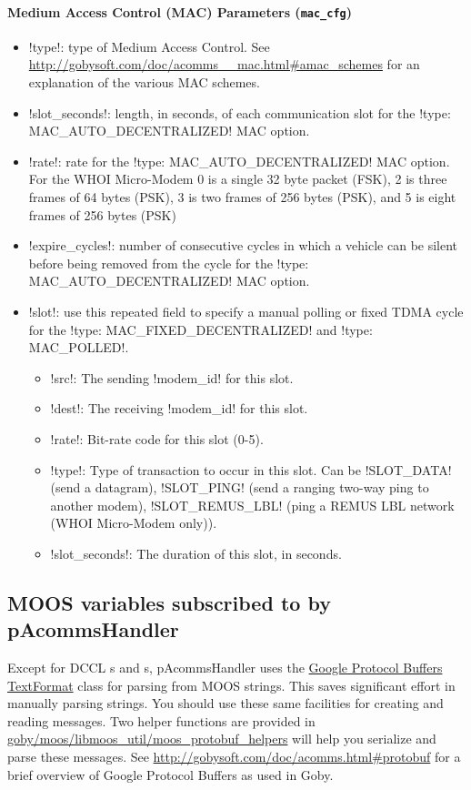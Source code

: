 \paragraph{Medium Access Control (MAC) Parameters (\texttt{mac\_cfg})}
\begin{itemize}
\item !type!: type of Medium Access Control. See \url{http://gobysoft.com/doc/acomms__mac.html#amac_schemes} for an explanation of the various MAC schemes.
\item !slot_seconds!: length, in seconds, of each communication slot for the !type: MAC_AUTO_DECENTRALIZED! MAC option.
\item !rate!: rate for the !type: MAC_AUTO_DECENTRALIZED! MAC option. For the WHOI Micro-Modem 0 is a single 32 byte packet (FSK), 2 is three frames of 64 bytes (PSK), 3 is two frames of 256 bytes (PSK), and 5 is eight frames of 256 bytes (PSK)
\item !expire_cycles!: number of consecutive cycles in which a vehicle can be silent before being removed from the cycle for the !type: MAC_AUTO_DECENTRALIZED! MAC option.
\item !slot!: use this repeated field to specify a manual polling or fixed TDMA cycle for the  !type: MAC_FIXED_DECENTRALIZED! and  !type: MAC_POLLED!. 
\begin{itemize}
\item !src!: The sending !modem_id! for this slot.
\item !dest!: The receiving !modem_id! for this slot.
\item !rate!: Bit-rate code for this slot (0-5).
\item !type!: Type of transaction to occur in this slot. Can be !SLOT_DATA! (send a datagram), !SLOT_PING! (send a ranging two-way ping to another modem), !SLOT_REMUS_LBL! (ping a REMUS LBL network (WHOI Micro-Modem only)).
\item !slot_seconds!: The duration of this slot, in seconds.
\end{itemize} 
\end{itemize} 

\subsection{MOOS variables subscribed to by pAcommsHandler}

Except for DCCL s and s, pAcommsHandler uses the \href{http://code.google.com/apis/protocolbuffers/docs/reference/cpp/google.protobuf.text_format.html}{Google Protocol Buffers TextFormat} class for parsing from MOOS strings. This saves significant effort in manually parsing strings. You should use these same facilities for creating and reading messages. Two helper functions are provided in \\ \href{http://gobysoft.com/doc/moos__protobuf__helpers_8h.html}{goby/moos/libmoos\_util/moos\_protobuf\_helpers} will help you serialize and parse these messages. See \url{http://gobysoft.com/doc/acomms.html#protobuf} for a brief overview of Google Protocol Buffers as used in Goby.

